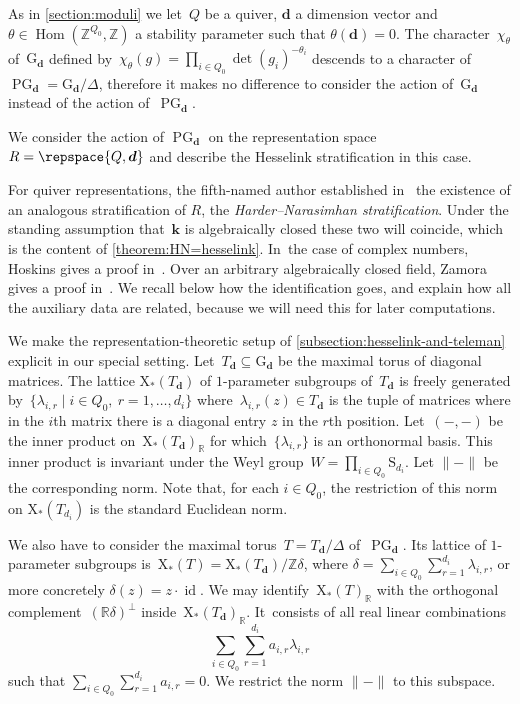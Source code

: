 \documentclass[JEP,XML,SOM,Unicode,NoEqCountersInSection,published]{cedram}
\theoremstyle{plain}
\theoremstyle{definition}
\DeclareMathOperator\Hom{Hom}
\DeclareMathOperator\PG{PG}
\newcommand\cocharacters{\ensuremath{\mathrm{X}_*}}
\newcommand\field{\mathbf{k}}
\newcommand\group[1][\tuple{d}]{\mathrm{G}_{#1}}
\newcommand\tuple[1]{\ensuremath{{\boldsymbol{#1}}}}
\begin{document}
\label{section:HN-vs-Hesselink}
As in \cref{section:moduli}
we let~$Q$ be a quiver, $\tuple{d}$ a dimension vector
and~$\theta \in\Hom(\mathbb{Z}^{Q_0},\mathbb{Z})$ a stability parameter
such that $\theta(\tuple{d})=0$.
The character~$\chi_\theta$ of~$\group$ defined by~$\chi_\theta(g) = \prod_{i \in Q_0} \det(g_i)^{-\theta_i}$
descends to a character of~$\PG_{\tuple{d}} = \group/\Delta$,
therefore it makes no difference to consider the action of~$\group$ instead of the action of~$\PG_{\tuple{d}}$.

We consider the action of $\PG_{\tuple{d}}$ on the representation space $R = \repspace{Q,\tuple{d}}$
and describe the Hesselink stratification in this case.

For quiver representations, the fifth-named author established in~\cite[Prop.\,3.4]{MR1974891}
the existence of an analogous stratification of $R$, the \emph{Harder--Narasimhan stratification}.
Under the standing assumption that~$\field$ is algebraically closed these two will coincide,
which is the content of \cref{theorem:HN=hesselink}. In~the case of complex numbers,
Hoskins gives a proof in~\cite[Th.\,3.8]{MR3871820}.
Over an arbitrary algebraically closed field,
Zamora gives a proof in~\cite[Th.\,6.3]{MR3199484}.
We recall below how the identification goes,
and explain how all the auxiliary data are related,
because we will need this for later computations.

We make the representation-theoretic setup of \cref{subsection:hesselink-and-teleman}
explicit in our special setting.
Let~$T_{\tuple{d}} \subseteq \group$ be the maximal torus of diagonal matrices.
The lattice $\cocharacters(T_{\tuple{d}})$ of $1$-parameter subgroups of~$T_{\tuple{d}}$
is freely generated by~$\{\lambda_{i,r} \mid i \in Q_0,\ r=1,\ldots,d_i\}$
where~$\lambda_{i,r}(z) \in T_{\tuple{d}}$
is the tuple of matrices where in the $i$th matrix there is a diagonal entry $z$
in the $r$th position.
Let~$(-,-)$ be the inner product on~$\cocharacters(T_{\tuple{d}})_\mathbb{R}$
for which~$\{\lambda_{i,r}\}$ is an orthonormal basis.
This inner product is invariant under the Weyl group~$W = \prod_{i \in Q_0}\mathrm{S}_{d_i}$.
Let $\|{-}\|$ be the corresponding norm.
Note that,
for each $i \in Q_0$,
the restriction of this norm on $\cocharacters(T_{d_i})$ is the standard Euclidean norm.

We also have to consider the maximal torus~$T = T_{\tuple{d}}/\Delta$ of~$\PG_{\tuple{d}}$.
Its lattice of $1$-parameter subgroups is~$\cocharacters(T) = \cocharacters(T_{\tuple{d}})/\mathbb{Z}\delta$,
where $\delta = \sum_{i\in Q_0}\sum_{r=1}^{d_i}\lambda_{i,r}$,
or more concretely $\delta(z) \!=\! z\cdot \operatorname{id}$.
We may identify~$\cocharacters(T)_\mathbb{R}$ with
the \hbox{orthogonal} complement~$(\mathbb{R}\delta)^\bot$ inside~$\cocharacters(T_{\tuple{d}})_\mathbb{R}$. It~consists of all real linear combinations
\[
\sum_{i\in Q_0}\sum_{r=1}^{d_i} a_{i,r}\lambda_{i,r}
\]
such that $\sum_{i\in Q_0}\sum_{r=1}^{d_i} a_{i,r} = 0$.
We restrict the norm $\|{-}\|$ to this subspace.
\end{document}
